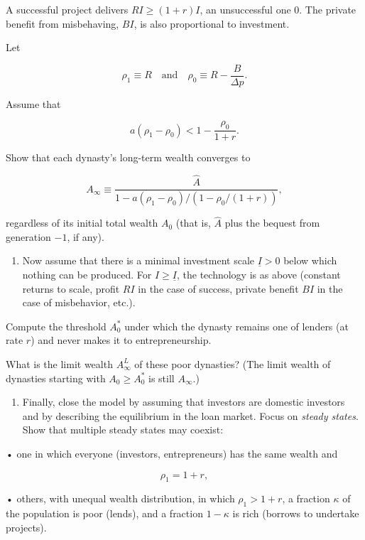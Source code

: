 \documentclass[11pt,a4paper]{article}
\providecommand{\tightlist}{\setlength{\itemsep}{0pt}\setlength{\parskip}{0pt}}
\begin{document}
A successful project delivers \(RI \geqslant (1 + r)I\), an unsuccessful one 0. The private benefit
from misbehaving, \(BI\), is also proportional to investment.

Let

\[\rho_1 \equiv R \quad\text{and}\quad \rho_0 \equiv R - \frac{B}{\Delta p}.\]

Assume that

\[a(\rho_1 - \rho_0) < 1 - \frac{\rho_0}{1 + r}.\]

Show that each dynasty's long-term wealth converges to

\[A_\infty \equiv \frac{\hat A}{1 - a(\rho_1 - \rho_0)/(1 - \rho_0/(1 + r))},\]

regardless of its initial total wealth \(A_0\) (that is, \(\hat A\) plus the bequest from generation
\(-1\), if any).

\begin{enumerate}
\def\labelenumi{(\roman{enumi})}
\setcounter{enumi}{2}
\tightlist
\item
  Now assume that there is a minimal investment scale \(\underline I > 0\) below which nothing can
  be produced. For \(I \geqslant \underline I\), the technology is as above (constant returns to
  scale, profit \(RI\) in the case of success, private benefit \(BI\) in the case of misbehavior,
  etc.).
\end{enumerate}

Compute the threshold \(A_0^*\) under which the dynasty remains one of lenders (at rate \(r\)) and
never makes it to entrepreneurship.

What is the limit wealth \(A_\infty^L\) of these poor dynasties? (The limit wealth of dynasties
starting with \(A_0 \geqslant A_0^*\) is still \(A_\infty\).)

\begin{enumerate}
\def\labelenumi{(\roman{enumi})}
\setcounter{enumi}{3}
\tightlist
\item
  Finally, close the model by assuming that investors are domestic investors and by describing the
  equilibrium in the loan market. Focus on \emph{steady states}. Show that multiple steady states
  may coexist:
\end{enumerate}

• one in which everyone (investors, entrepreneurs) has the same wealth and

\[\rho_1 = 1 + r,\]

• others, with unequal wealth distribution, in which \(\rho_1 > 1 + r\), a fraction \(\kappa\) of
the population is poor (lends), and a fraction \(1 - \kappa\) is rich (borrows to undertake
projects).
\end{document}
